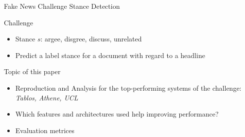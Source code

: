 \documentclass[english,handout]{mlutalk}
\begin{document}
\begin{frame}[allowframebreaks]{Fake News Challenge Stance Detection~\cite{HanselowskiSSCC2018}}
  \begin{block}{Challenge}
    \begin{itemize}
      \item Stance $s$: argee, disgree, discuss, unrelated
      \item Predict a label stance for a document with regard to a headline
    \end{itemize}
  \end{block} %
  \begin{block}{Topic of this paper}
      \begin{itemize}
        \item Reproduction and Analysis for the top-performing systems of the challenge: \textit{Tablos, Athene, UCL}
        \item Which features and architectures used help improving performance?
        \item Evaluation metrices
      \end{itemize}
  \end{block}
  

\end{frame}
\end{document}

